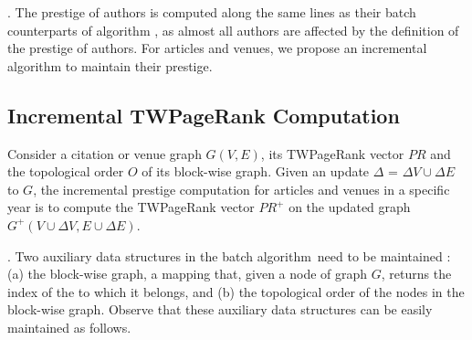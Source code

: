 .
The prestige of authors is computed along the same lines as their batch counterparts of algorithm \batensemble,
as almost all authors are affected  by the definition of the prestige of authors.
%
For articles and venues, we propose an incremental algorithm to maintain their prestige.







\subsection{Incremental TWPageRank Computation}
\label{subsec-incTWPageRank-computation}





Consider a citation or venue graph $G(V, E)$, its TWPageRank vector $PR$ and the topological order $O$ of its block-wise graph. Given an update $\Delta$ = $\Delta V\cup\Delta E$ to $G$, the incremental prestige computation for articles and venues in a specific year is to compute the TWPageRank vector $PR^+$ on the updated graph $G^+(V\cup\Delta V, E\cup\Delta E)$.


.
Two auxiliary data structures in the batch algorithm~\twprscc need to be maintained : (a) the block-wise graph,  a mapping that, given a node of graph $G$, returns the index of the \scc to which it belongs, and (b) the topological order of the nodes in the block-wise graph.
%
Observe that these auxiliary data structures can be easily maintained as follows.

